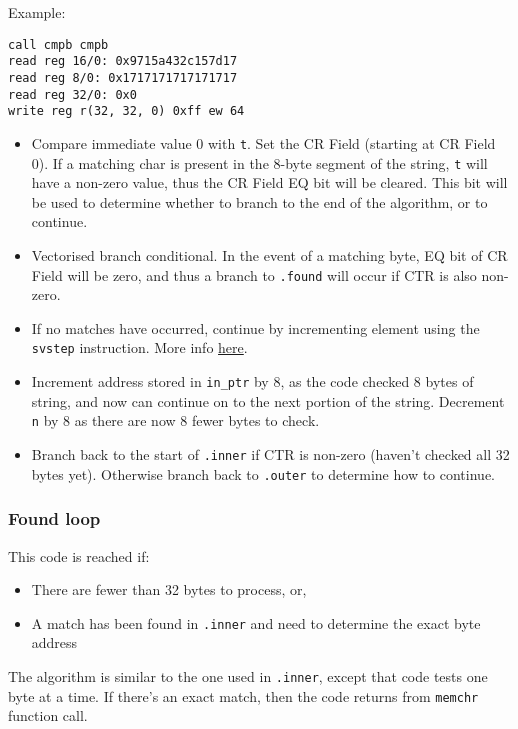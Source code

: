 Example:
\begin{verbatim}
call cmpb cmpb
read reg 16/0: 0x9715a432c157d17
read reg 8/0: 0x1717171717171717
read reg 32/0: 0x0
write reg r(32, 32, 0) 0xff ew 64
\end{verbatim}

\begin{itemize}
  \item Compare immediate value 0 with \texttt{t}. Set the \acrshort{CR} Field
  (starting at \acrshort{CR} Field 0). If a matching char is present in the 8-byte
  segment of the string, \texttt{t} will have a non-zero value, thus the
  \acrshort{CR} Field EQ bit will be cleared. This bit will be used to determine whether
  to branch to the end of the algorithm, or to continue.
  \item Vectorised branch conditional. In the event of a matching byte,
  EQ bit of \acrshort{CR} Field will be zero, and thus a branch to \texttt{.found}
  will occur if \acrshort{CTR} is also non-zero.
  \item If no matches have occurred, continue by incrementing element using
  the \texttt{svstep} instruction. More info
  \href{https://libre-soc.org/openpower/sv/svstep/}{here}.
  \item Increment address stored in \texttt{in\_ptr} by 8, as the code checked
  8 bytes of string, and now can continue on to the next portion of the string.
  Decrement \texttt{n} by 8 as there are now 8 fewer bytes to check.
  \item Branch back to the start of \texttt{.inner} if \acrshort{CTR} is non-zero
  (haven't checked all 32 bytes yet). Otherwise branch back to \texttt{.outer}
  to determine how to continue.
\end{itemize}

\subsubsection{Found loop}

This code is reached if:

\begin{itemize}
  \item There are fewer than 32 bytes to process, or,
  \item A match has been found in \texttt{.inner} and need to determine the
  exact byte address
\end{itemize}

The algorithm is similar to the one used in \texttt{.inner}, except that code tests
one byte at a time. If there's an exact match, then the code returns from
\texttt{memchr} function call.

